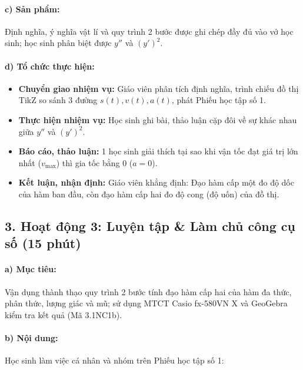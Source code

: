 \documentclass[12pt, a4paper]{article}
\begin{document}
\paragraph{c) Sản phẩm:} Định nghĩa, ý nghĩa vật lí và quy trình 2 bước được ghi chép đầy đủ vào vở học sinh; học sinh phân biệt được $y''$ và $(y')^2$.

\paragraph{d) Tổ chức thực hiện:}
\begin{itemize}[leftmargin=0.8cm]
    \item \textbf{Chuyển giao nhiệm vụ:} Giáo viên phân tích định nghĩa, trình chiếu đồ thị TikZ so sánh 3 đường $s(t), v(t), a(t)$, phát Phiếu học tập số 1.
    \item \textbf{Thực hiện nhiệm vụ:} Học sinh ghi bài, thảo luận cặp đôi về sự khác nhau giữa $y''$ và $(y')^2$.
    \item \textbf{Báo cáo, thảo luận:} 1 học sinh giải thích tại sao khi vận tốc đạt giá trị lớn nhất ($v_{\text{max}}$) thì gia tốc bằng $0$ ($a = 0$).
    \item \textbf{Kết luận, nhận định:} Giáo viên khẳng định: Đạo hàm cấp một đo độ dốc của hàm ban đầu, còn đạo hàm cấp hai đo độ cong (độ uốn) của đồ thị.
\end{itemize}

\subsection*{3. Hoạt động 3: Luyện tập & Làm chủ công cụ số (15 phút)}

\paragraph{a) Mục tiêu:} Vận dụng thành thạo quy trình 2 bước tính đạo hàm cấp hai của hàm đa thức, phân thức, lượng giác và mũ; sử dụng MTCT Casio fx-580VN X và GeoGebra kiểm tra kết quả (Mã 3.1NC1b).

\paragraph{b) Nội dung:} Học sinh làm việc cá nhân và nhóm trên Phiếu học tập số 1:
\end{document}
